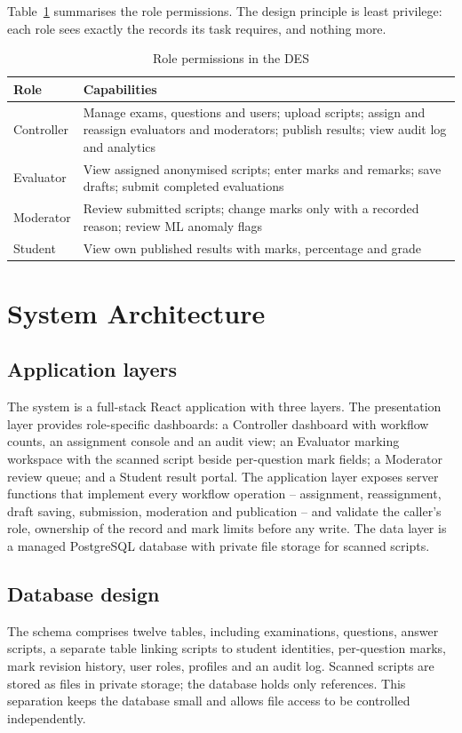 \documentclass[conference]{IEEEtran}
\begin{document}
Table~\ref{tab:roles} summarises the role permissions. The design principle is least privilege: each role sees exactly the records its task requires, and nothing more.

\begin{table}[t]\centering\caption{Role permissions in the DES}\label{tab:roles}
\begin{tabular}{p{1.35cm}p{6.3cm}}\toprule
Role & Capabilities \\\midrule
Controller & Manage exams, questions and users; upload scripts; assign and reassign evaluators and moderators; publish results; view audit log and analytics \\
Evaluator & View assigned anonymised scripts; enter marks and remarks; save drafts; submit completed evaluations \\
Moderator & Review submitted scripts; change marks only with a recorded reason; review ML anomaly flags \\
Student & View own published results with marks, percentage and grade \\
\bottomrule\end{tabular}\end{table}

\section{System Architecture}
\subsection{Application layers}
The system is a full-stack React application with three layers. The presentation layer provides role-specific dashboards: a Controller dashboard with workflow counts, an assignment console and an audit view; an Evaluator marking workspace with the scanned script beside per-question mark fields; a Moderator review queue; and a Student result portal. The application layer exposes server functions that implement every workflow operation -- assignment, reassignment, draft saving, submission, moderation and publication -- and validate the caller's role, ownership of the record and mark limits before any write. The data layer is a managed PostgreSQL database with private file storage for scanned scripts.

\subsection{Database design}
The schema comprises twelve tables, including examinations, questions, answer scripts, a separate table linking scripts to student identities, per-question marks, mark revision history, user roles, profiles and an audit log. Scanned scripts are stored as files in private storage; the database holds only references. This separation keeps the database small and allows file access to be controlled independently.
\end{document}
